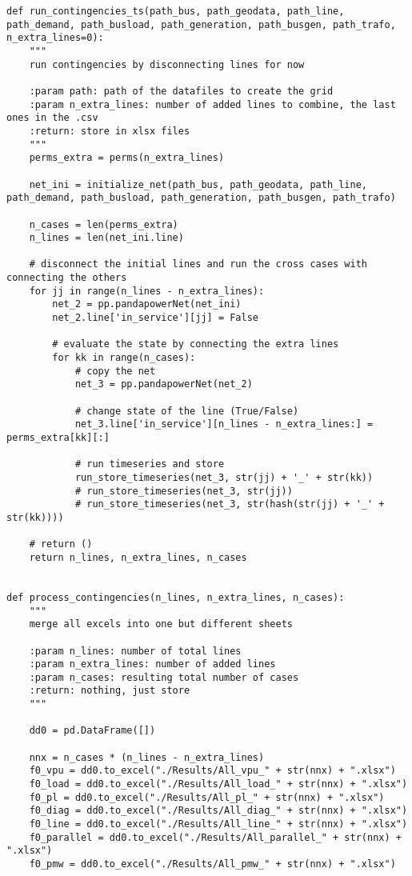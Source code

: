 \begin{lstlisting}[caption={Main code in Python with the Pandapower library}]
def run_contingencies_ts(path_bus, path_geodata, path_line, path_demand, path_busload, path_generation, path_busgen, path_trafo, n_extra_lines=0):
    """
    run contingencies by disconnecting lines for now

    :param path: path of the datafiles to create the grid
    :param n_extra_lines: number of added lines to combine, the last ones in the .csv
    :return: store in xlsx files
    """
    perms_extra = perms(n_extra_lines)

    net_ini = initialize_net(path_bus, path_geodata, path_line, path_demand, path_busload, path_generation, path_busgen, path_trafo)

    n_cases = len(perms_extra)
    n_lines = len(net_ini.line)

    # disconnect the initial lines and run the cross cases with connecting the others
    for jj in range(n_lines - n_extra_lines):
        net_2 = pp.pandapowerNet(net_ini)
        net_2.line['in_service'][jj] = False

        # evaluate the state by connecting the extra lines
        for kk in range(n_cases):
            # copy the net
            net_3 = pp.pandapowerNet(net_2)

            # change state of the line (True/False)
            net_3.line['in_service'][n_lines - n_extra_lines:] = perms_extra[kk][:]

            # run timeseries and store
            run_store_timeseries(net_3, str(jj) + '_' + str(kk))
            # run_store_timeseries(net_3, str(jj))
            # run_store_timeseries(net_3, str(hash(str(jj) + '_' + str(kk))))

    # return ()
    return n_lines, n_extra_lines, n_cases


def process_contingencies(n_lines, n_extra_lines, n_cases):
    """
    merge all excels into one but different sheets

    :param n_lines: number of total lines
    :param n_extra_lines: number of added lines
    :param n_cases: resulting total number of cases
    :return: nothing, just store
    """

    dd0 = pd.DataFrame([])

    nnx = n_cases * (n_lines - n_extra_lines)
    f0_vpu = dd0.to_excel("./Results/All_vpu_" + str(nnx) + ".xlsx")
    f0_load = dd0.to_excel("./Results/All_load_" + str(nnx) + ".xlsx")
    f0_pl = dd0.to_excel("./Results/All_pl_" + str(nnx) + ".xlsx")
    f0_diag = dd0.to_excel("./Results/All_diag_" + str(nnx) + ".xlsx")
    f0_line = dd0.to_excel("./Results/All_line_" + str(nnx) + ".xlsx")
    f0_parallel = dd0.to_excel("./Results/All_parallel_" + str(nnx) + ".xlsx") 
    f0_pmw = dd0.to_excel("./Results/All_pmw_" + str(nnx) + ".xlsx")



\end{lstlisting}
